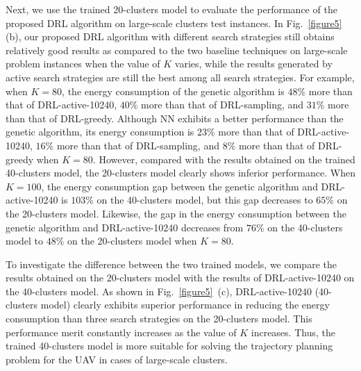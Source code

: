 \documentclass[journal]{IEEEtran}
\begin{document}
Next, we use the trained 20-clusters model to evaluate the performance of the proposed DRL algorithm on large-scale clusters test instances. In Fig.~\ref{figure5} (b), our proposed DRL algorithm with different search strategies still obtains relatively good results as compared to the two baseline techniques on large-scale problem instances when the value of $K$ varies, while the results generated by active search strategies are still the best among all search strategies. For example, when $K=80$, the energy consumption of the genetic algorithm is $48\%$ more than that of DRL-active-10240, $40\%$ more than that of DRL-sampling, and $31\%$ more than that of DRL-greedy.  Although NN exhibits a better performance than the genetic algorithm, its energy consumption is $23\%$ more than that of DRL-active-10240, $16\%$ more than that of DRL-sampling, and $8\%$ more than that of DRL-greedy when $K=80$. However, compared with the results obtained on the trained 40-clusters model, the 20-clusters model clearly shows inferior performance. When $K=100$, the energy consumption gap between the genetic algorithm and DRL-active-10240 is $103\%$ on the 40-clusters model, but this gap decreases to $65\%$ on the 20-clusters model. Likewise, the gap in the energy consumption between the genetic algorithm and DRL-active-10240 decreases from $76\%$ on the 40-clusters model to $48\%$ on the 20-clusters model when $K=80$.

To investigate the difference between the two trained models, we compare the results obtained on the 20-clusters model with the results of DRL-active-10240 on the 40-clusters model. As shown in Fig.~\ref{figure5}~(c), DRL-active-10240 (40-clusters model) clearly exhibits superior performance in reducing the energy consumption than three search strategies on the 20-clusters model. This performance merit constantly increases as the value of $K$ increases. Thus, the trained 40-clusters model is more suitable for solving the trajectory planning problem for the UAV in cases of large-scale clusters.
\end{document}
